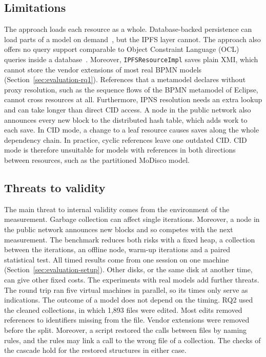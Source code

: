 \documentclass[5p,times,twocolumn]{elsarticle}
\theoremstyle{definition}
\theoremstyle{plain}
\begin{document}
\subsection{Limitations}\label{sec:limitations}

The approach loads each resource as a whole. Database-backed persistence can load parts of a model on demand~\cite{pagan2011morsa,daniel2017neoemf}, but the IPFS layer cannot. The approach also offers no query support comparable to Object Constraint Language (OCL) queries inside a database~\cite{omg2014ocl,daniel2016mogwai}. Moreover, \texttt{IPFSResourceImpl} saves plain XMI, which cannot store the vendor extensions of most real BPMN models (Section~\ref{sec:evaluation-rq1}). References that a metamodel declares without proxy resolution, such as the sequence flows of the BPMN metamodel of Eclipse, cannot cross resources at all. Furthermore, IPNS resolution needs an extra lookup and can take longer than direct CID access. A node in the public network also announces every new block to the distributed hash table, which adds work to each save. In CID mode, a change to a leaf resource causes saves along the whole dependency chain. In practice, cyclic references leave one outdated CID. CID mode is therefore unsuitable for models with references in both directions between resources, such as the partitioned MoDisco model.

\subsection{Threats to validity}\label{sec:threats}

The main threat to internal validity comes from the environment of the measurement. Garbage collection can affect single iterations. Moreover, a node in the public network announces new blocks and so competes with the next measurement. The benchmark reduces both risks with a fixed heap, a collection between the iterations, an offline node, warm-up iterations and a paired statistical test. All timed results come from one session on one machine (Section~\ref{sec:evaluation-setup}). Other disks, or the same disk at another time, can give other fixed costs. The experiments with real models add further threats. The round trip ran five virtual machines in parallel, so its times only serve as indications. The outcome of a model does not depend on the timing. RQ2 used the cleaned collections, in which 1,893 files were edited. Most edits removed references to identifiers missing from the file. Vendor extensions were removed before the split. Moreover, a script restored the calls between files by naming rules, and the rules may link a call to the wrong file of a collection. The checks of the cascade hold for the restored structures in either case.
\end{document}
